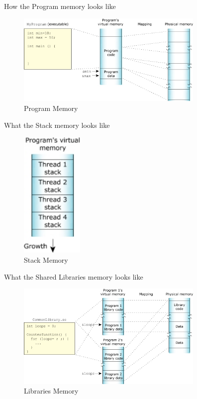 \documentclass[12pt]{beamer}
\begin{document}
\begin{frame}{How the Program memory looks like}
	\begin{figure}[h!]
		\centering
		\includegraphics[width=9cm]{2.jpg}
		\caption{Program Memory}
	\end{figure}
\end{frame}

\begin{frame}{What the Stack memory looks like}
	\begin{figure}[h!]
		\centering
		\includegraphics[width=3cm]{3.jpg}
		\caption{Stack Memory}
	\end{figure}
\end{frame}


\begin{frame}{What the Shared Libraries memory looks like}
	\begin{figure}[h!]
		\centering
		\includegraphics[width=9cm]{5.jpg}
		\caption{Libraries Memory}
	\end{figure}
\end{frame}
\end{document}
